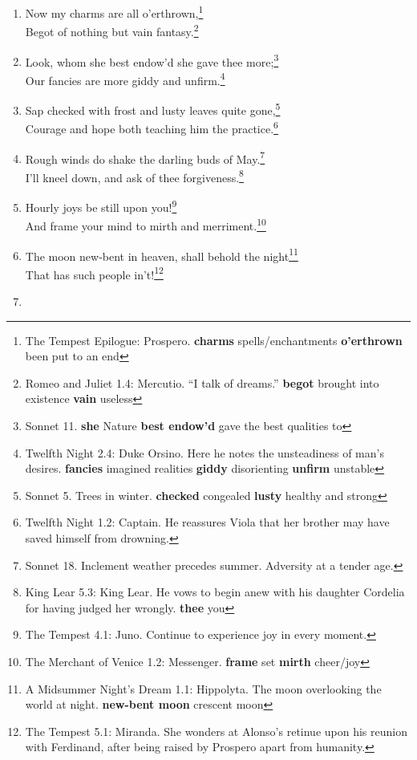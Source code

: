 \documentclass[17pt,twoside]{extarticle}
\begin{document}
\begin{enumerate}
  mind.\footnote{Richard III 3.7: Buckingham}
\item
  Now my charms are all o'erthrown,\footnote{The Tempest Epilogue:
    Prospero. \textbf{charms} spells/enchantments \textbf{o'erthrown}
    been put to an end}\\Begot of nothing but vain fantasy.\footnote{Romeo
    and Juliet 1.4: Mercutio. ``I talk of dreams.'' \textbf{begot}
    brought into existence \textbf{vain} useless}
\item
  Look, whom she best endow'd she gave thee more;\footnote{Sonnet 11.
    \textbf{she} Nature \textbf{best endow'd} gave the best qualities to}\\Our
  fancies are more giddy and unfirm.\footnote{Twelfth Night 2.4: Duke
    Orsino. Here he notes the unsteadiness of man's desires.
    \textbf{fancies} imagined realities \textbf{giddy} disorienting
    \textbf{unfirm} unstable}
\item
  Sap checked with frost and lusty leaves quite gone,\footnote{Sonnet 5.
    Trees in winter. \textbf{checked} congealed \textbf{lusty} healthy
    and strong}\\Courage and hope both teaching him the
  practice.\footnote{Twelfth Night 1.2: Captain. He reassures Viola that
    her brother may have saved himself from drowning.}
\item
  Rough winds do shake the darling buds of May.\footnote{Sonnet 18.
    Inclement weather precedes summer. Adversity at a tender age.}\\I'll
  kneel down, and ask of thee forgiveness.\footnote{King Lear 5.3: King
    Lear. He vows to begin anew with his daughter Cordelia for having
    judged her wrongly. \textbf{thee} you}
\item
  Hourly joys be still upon you!\footnote{The Tempest 4.1: Juno.
    Continue to experience joy in every moment.}\\And frame your mind to
  mirth and merriment.\footnote{The Merchant of Venice 1.2: Messenger.
    \textbf{frame} set \textbf{mirth} cheer/joy}
\item
  The moon new-bent in heaven, shall behold the night\footnote{A
    Midsummer Night's Dream 1.1: Hippolyta. The moon overlooking the
    world at night. \textbf{new-bent moon} crescent moon}\\That has such
  people in't!\footnote{The Tempest 5.1: Miranda. She wonders at
    Alonso's retinue upon his reunion with Ferdinand, after being raised
    by Prospero apart from humanity.}
\item

\end{enumerate}
\end{document}
